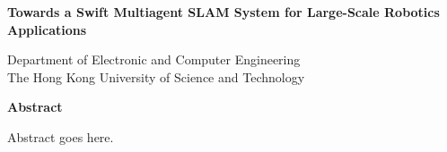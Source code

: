 \begin{center}
{\Large\bf Towards a Swift Multiagent SLAM System for Large-Scale Robotics Applications}
\vspace{0.5cm}

{\large \bf \thesisWriter{}}\normalsize

\medskip

Department of Electronic and Computer Engineering\\ The Hong Kong University of Science and Technology

\end{center}
\vspace{1.5cm}
\centerline{{\bf \large Abstract}}
\vspace{1.5cm}

Abstract goes here.












